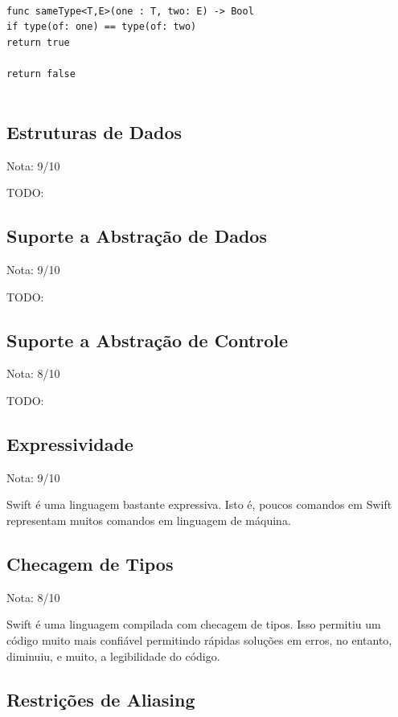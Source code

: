 \documentclass[rel_mlp]{iiufrgs}
\newcommand\tab[1][1cm]{\hspace*{#1}}
\begin{document}
\texttt{
\\func sameType<T,E>(one : T, two: E) -> Bool {
\\\tab if type(of: one) == type(of: two) {
\\\tab\tab return true
\\\tab}
\\return false
\\}
}

\subsection{Estruturas de Dados}

Nota: 9/10

TODO:

\subsection{Suporte a Abstração de Dados}

Nota: 9/10

TODO:

\subsection{Suporte a Abstração de Controle}

Nota: 8/10

TODO:

\subsection{Expressividade}

Nota: 9/10

Swift é uma linguagem bastante expressiva. Isto é, poucos comandos em Swift representam muitos comandos em linguagem de máquina.

\subsection{Checagem de Tipos}

Nota: 8/10

Swift é uma linguagem compilada com checagem de tipos. Isso permitiu um código muito mais confiável permitindo rápidas soluções em erros, no entanto, diminuiu, e muito, a legibilidade do código. 

\subsection{Restrições de Aliasing}
\end{document}
